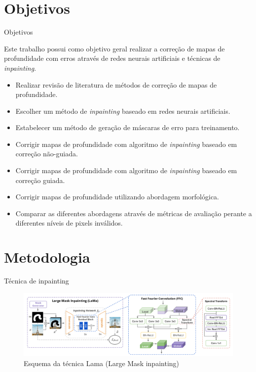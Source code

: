 \documentclass[aspectratio=169]{beamer}
\begin{document}
\section{Objetivos}

\begin{frame}{Objetivos}

Este trabalho possui como objetivo geral realizar a correção de mapas de profundidade com erros através de redes neurais artificiais e técnicas de \textit{inpainting}.

\begin{itemize}
    \item Realizar revisão de literatura de métodos de correção de mapas de profundidade.
    \item Escolher um método de \textit{inpainting} baseado em redes neurais artificiais.
    \item Estabelecer um método de geração de máscaras de erro para treinamento.
    \item Corrigir mapas de profundidade com algoritmo de \textit{inpainting} baseado em correção não-guiada.
    \item Corrigir mapas de profundidade com algoritmo de \textit{inpainting} baseado em correção guiada.
    \item Corrigir mapas de profundidade utilizando abordagem morfológica.
    \item Comparar as diferentes abordagens através de métricas de avaliação perante a diferentes níveis de pixels inválidos.
    
\end{itemize}

\end{frame}
\section{Metodologia}


\begin{frame}{Técnica de inpainting}
\begin{figure}
    \centering
    \includegraphics[width=\textwidth]{figs/lama.png}
    \caption{Esquema da técnica Lama (Large Mask inpainting)}
    \label{fig:enter-label}
\end{figure}
    
\end{frame}
\end{document}

